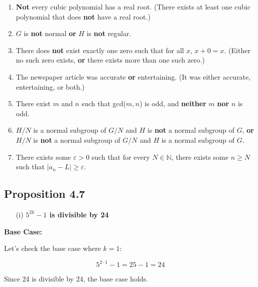 \documentclass[12pt]{article}
\begin{document}
\begin{enumerate}
    \item \textbf{Not} every cubic polynomial has a real root. (There exists at least one cubic polynomial that does \textbf{not} have a real root.)
    
    \item \( G \) is \textbf{not} normal \textbf{or} \( H \) is \textbf{not} regular.
    
    \item There does \textbf{not} exist exactly one zero such that for all \( x \), \( x + 0 = x \). (Either no such zero exists, \textbf{or} there exists more than one such zero.)
    
    \item The newspaper article was accurate \textbf{or} entertaining. (It was either accurate, entertaining, or both.)
    
    \item There exist \( m \) and \( n \) such that gcd(\( m, n \)) is odd, and \textbf{neither} \( m \) \textbf{nor} \( n \) is odd.
    
    \item \( H/N \) is a normal subgroup of \( G/N \) and \( H \) is \textbf{not} a normal subgroup of \( G \), \textbf{or} \( H/N \) is \textbf{not} a normal subgroup of \( G/N \) and \( H \) is a normal subgroup of \( G \).
    
    \item There exists some \( \varepsilon > 0 \) such that for every \( N \in \mathbb{N} \), there exists some \( n \geq N \) such that \( |a_n - L| \geq \varepsilon \).
\end{enumerate}



\subsection*{Proposition 4.7}
\begin{enumerate}
    \item[(i)] \textbf{\( 5^{2k} - 1 \) is divisible by 24}
\end{enumerate}

\noindent \textbf{Base Case:}

Let's check the base case where \( k = 1 \):

\[ 5^{2 \cdot 1} - 1 = 25 - 1 = 24 \]

Since 24 is divisible by 24, the base case holds. \\
\end{document}
